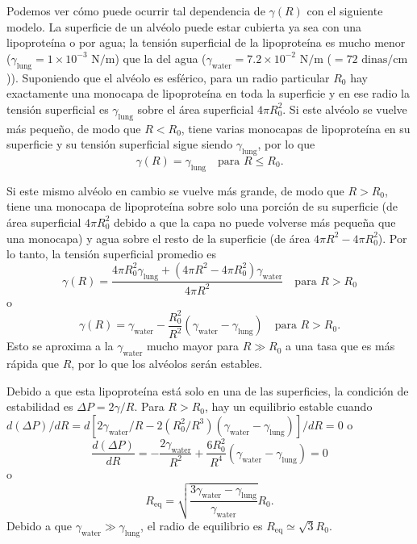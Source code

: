 \documentclass[12pt]{book}
\begin{document}
Podemos ver cómo puede ocurrir tal dependencia de $\gamma(R)$ con el siguiente modelo. La superficie de un alvéolo puede estar cubierta ya sea con una lipoproteína o por agua; la tensión superficial de la lipoproteína es mucho menor ($\gamma_{\text{lung}} = 1 \times 10^{-3}\text{ N/m}$) que la del agua ($\gamma_{\text{water}} = 7.2 \times 10^{-2}\text{ N/m}$ ($= 72\text{ dinas/cm}$)). Suponiendo que el alvéolo es esférico, para un radio particular $R_0$ hay exactamente una monocapa de lipoproteína en toda la superficie y en ese radio la tensión superficial es $\gamma_{\text{lung}}$ sobre el área superficial $4 \pi R_0^2$. Si este alvéolo se vuelve más pequeño, de modo que $R < R_0$, tiene varias monocapas de lipoproteína en su superficie y su tensión superficial sigue siendo $\gamma_{\text{lung}}$, por lo que
\begin{equation}
\gamma(R) = \gamma_{\text{lung}} \quad \text{para } R \le R_0.
\label{eq:9.4}
\end{equation}

Si este mismo alvéolo en cambio se vuelve más grande, de modo que $R > R_0$, tiene una monocapa de lipoproteína sobre solo una porción de su superficie (de área superficial $4\pi R_0^2$ debido a que la capa no puede volverse más pequeña que una monocapa) y agua sobre el resto de la superficie (de área $4\pi R^2 - 4\pi R_0^2$). Por lo tanto, la tensión superficial promedio es
\begin{equation}
\gamma(R) = \frac{4\pi R_0^2 \gamma_{\text{lung}} + (4\pi R^2 - 4\pi R_0^2)\gamma_{\text{water}}}{4\pi R^2} \quad \text{para } R > R_0
\label{eq:9.5}
\end{equation}
o
\begin{equation}
\gamma(R) = \gamma_{\text{water}} - \frac{R_0^2}{R^2} (\gamma_{\text{water}} - \gamma_{\text{lung}}) \quad \text{para } R > R_0.
\label{eq:9.6}
\end{equation}
Esto se aproxima a la $\gamma_{\text{water}}$ mucho mayor para $R \gg R_0$ a una tasa que es más rápida que $R$, por lo que los alvéolos serán estables.


Debido a que esta lipoproteína está solo en una de las superficies, la condición de estabilidad es $\Delta P = 2\gamma/R$. Para $R > R_0$, hay un equilibrio estable cuando $d(\Delta P)/dR = d[2\gamma_{\text{water}}/R - 2(R_0^2/R^3)(\gamma_{\text{water}} - \gamma_{\text{lung}})]/dR = 0$ o
\begin{equation}
\frac{d(\Delta P)}{dR} = -\frac{2\gamma_{\text{water}}}{R^2} + \frac{6 R_0^2}{R^4} (\gamma_{\text{water}} - \gamma_{\text{lung}}) = 0
\label{eq:9.7}
\end{equation}
o
\begin{equation}
R_{\text{eq}} = \sqrt{\frac{3\gamma_{\text{water}} - \gamma_{\text{lung}}}{\gamma_{\text{water}}}} R_0.
\label{eq:9.8}
\end{equation}
Debido a que $\gamma_{\text{water}} \gg \gamma_{\text{lung}}$, el radio de equilibrio es $R_{\text{eq}} \simeq \sqrt{3}R_0$.
\end{document}
